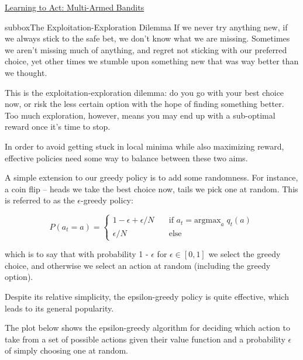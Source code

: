 \begin{textbox}{\href{https://compneuro.neuromatch.io/tutorials/W3D4_ReinforcementLearning/student/W3D4_Tutorial2.html}{Learning to Act: Multi-Armed Bandits } }

\begin{subbox}{subbox}{The Exploitation-Exploration Dilemma}
\scriptsize
If we never try anything new, if we always stick to the safe bet, we don't know what we are missing. Sometimes we aren't missing much of anything, and regret not sticking with our preferred choice, yet other times we stumble upon something new that was way better than we thought.

This is the exploitation-exploration dilemma: do you go with your best choice now, or risk the less certain option with the hope of finding something better. Too much exploration, however, means you may end up with a sub-optimal reward once it's time to stop.

In order to avoid getting stuck in local minima while also maximizing reward, effective policies need some way to balance between these two aims.

A simple extension to our greedy policy is to add some randomness. For instance, a coin flip -- heads we take the best choice now, tails we pick one at random. This is referred to as the $\epsilon$-greedy policy:

\begin{equation}
P (a_{t} = a) = 
        \begin{cases}
        1 - \epsilon + \epsilon/N    & \quad \text{if } a_{t} = \text{argmax}_{a} \; q_{t} (a) \\
        \epsilon/N        & \quad \text{else} 
        \end{cases} 
\end{equation}

which is to say that with probability 1 - $\epsilon$ for $\epsilon \in [0,1]$ we select the greedy choice, and otherwise we select an action at random (including the greedy option).

Despite its relative simplicity, the epsilon-greedy policy is quite effective, which leads to its general popularity.

The plot below shows the epsilon-greedy algorithm for deciding which action to take from a set of possible actions given their value function and a probability $\epsilon$ of simply choosing one at random. 
\begin{center}
    

\end{center}
\end{subbox}
\end{textbox}
